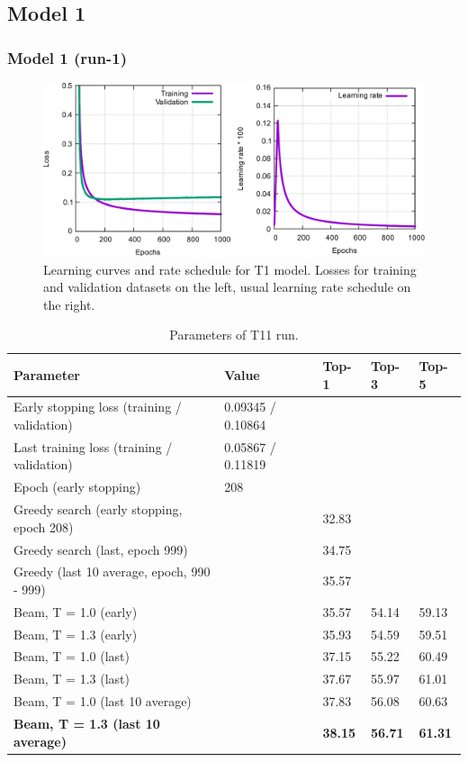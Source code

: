 \documentclass{article}
\begin{document}
\subsection{Model 1} 
\subsubsection{Model 1 (run-1)}
  
\begin{figure}[h!]
  \centering
  \includegraphics[width = 16.5cm]{images/t1-1.pdf}
  \caption{Learning curves and rate schedule for T1 model. Losses for training and validation datasets on the left, usual learning rate schedule on the right.}
  \label{fig:t11}
\end{figure}

\begin{table}[h!]
\caption{Parameters of T11 run.}
  \centering
  \begin{tabular}{p{6.2cm}p{3.5cm}p{1.5cm}p{1.5cm}p{1.5cm}}
    \toprule
    Parameter & Value & Top-1 & Top-3 & Top-5 \\
    \midrule
    Early stopping loss (training / validation) &  0.09345 / 0.10864 & & & \\
    Last training loss (training / validation) &  0.05867 / 0.11819& & & \\
    Epoch (early stopping) & 208 & & & \\
    \midrule
    Greedy search (early stopping, epoch 208) & & 32.83 & &\\
    Greedy search (last, epoch 999) & & 34.75 & & \\
    Greedy (last 10 average, epoch, 990 - 999) & & 35.57 & & \\
    \midrule
    Beam, T = 1.0 (early) & & 35.57 & 54.14 & 59.13 \\
    Beam, T = 1.3 (early) & & 35.93 & 54.59 & 59.51 \\ 
    \midrule
    Beam, T = 1.0 (last) & & 37.15 & 55.22 &  60.49 \\
    Beam, T = 1.3 (last) & & 37.67 & 55.97 & 61.01 \\ 
    \midrule
    Beam, T = 1.0 (last 10 average) & & 37.83 & 56.08 &  60.63 \\
    \textbf{Beam, T = 1.3 (last 10 average)}  & & \textbf{38.15} & \textbf{56.71} & \textbf{61.31} \\ 
    \bottomrule
  \end{tabular}
  \label{tbl:t11}

\end{table} 
\end{document}
